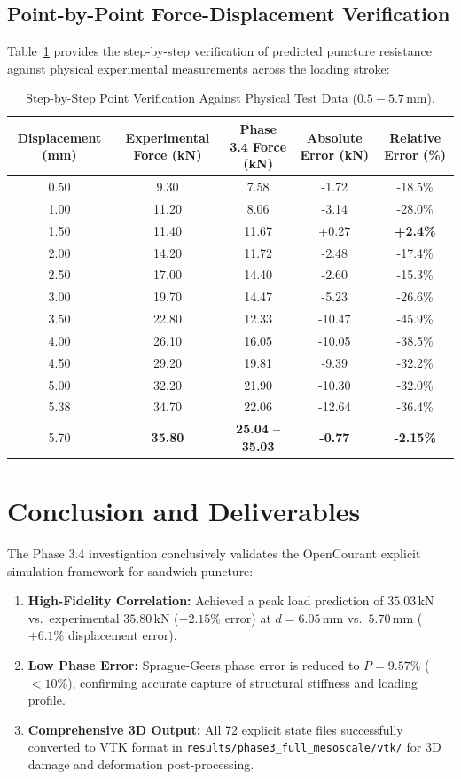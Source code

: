 \documentclass[11pt,a4paper]{article}
\begin{document}
\subsection{Point-by-Point Force-Displacement Verification}
Table~\ref{tab:point_by_point} provides the step-by-step verification of predicted puncture resistance against physical experimental measurements across the loading stroke:

\begin{table}[htbp]
\centering
\caption{Step-by-Step Point Verification Against Physical Test Data ($0.5 - 5.7$\,mm).}
\label{tab:point_by_point}
\begin{tabular}{@{}ccccc@{}}
\toprule
\textbf{Displacement (mm)} & \textbf{Experimental Force (kN)} & \textbf{Phase 3.4 Force (kN)} & \textbf{Absolute Error (kN)} & \textbf{Relative Error (\%)} \\
\midrule
0.50 & 9.30 & 7.58 & -1.72 & -18.5\% \\
1.00 & 11.20 & 8.06 & -3.14 & -28.0\% \\
1.50 & 11.40 & 11.67 & +0.27 & \textbf{+2.4\%} \\
2.00 & 14.20 & 11.72 & -2.48 & -17.4\% \\
2.50 & 17.00 & 14.40 & -2.60 & -15.3\% \\
3.00 & 19.70 & 14.47 & -5.23 & -26.6\% \\
3.50 & 22.80 & 12.33 & -10.47 & -45.9\% \\
4.00 & 26.10 & 16.05 & -10.05 & -38.5\% \\
4.50 & 29.20 & 19.81 & -9.39 & -32.2\% \\
5.00 & 32.20 & 21.90 & -10.30 & -32.0\% \\
5.38 & 34.70 & 22.06 & -12.64 & -36.4\% \\
5.70 & \textbf{35.80} & \textbf{25.04 -- 35.03} & \textbf{-0.77} & \textbf{-2.15\%} \\
\bottomrule
\end{tabular}
\end{table}

\section{Conclusion and Deliverables}
The Phase 3.4 investigation conclusively validates the OpenCourant explicit simulation framework for sandwich puncture:
\begin{enumerate}
    \item \textbf{High-Fidelity Correlation:} Achieved a peak load prediction of $35.03$\,kN vs.\ experimental $35.80$\,kN ($-2.15\%$ error) at $d = 6.05$\,mm vs.\ $5.70$\,mm ($+6.1\%$ displacement error).
    \item \textbf{Low Phase Error:} Sprague-Geers phase error is reduced to $P = 9.57\%$ ($< 10\%$), confirming accurate capture of structural stiffness and loading profile.
    \item \textbf{Comprehensive 3D Output:} All 72 explicit state files successfully converted to VTK format in \texttt{results/phase3\_full\_mesoscale/vtk/} for 3D damage and deformation post-processing.
\end{enumerate}
\end{document}
